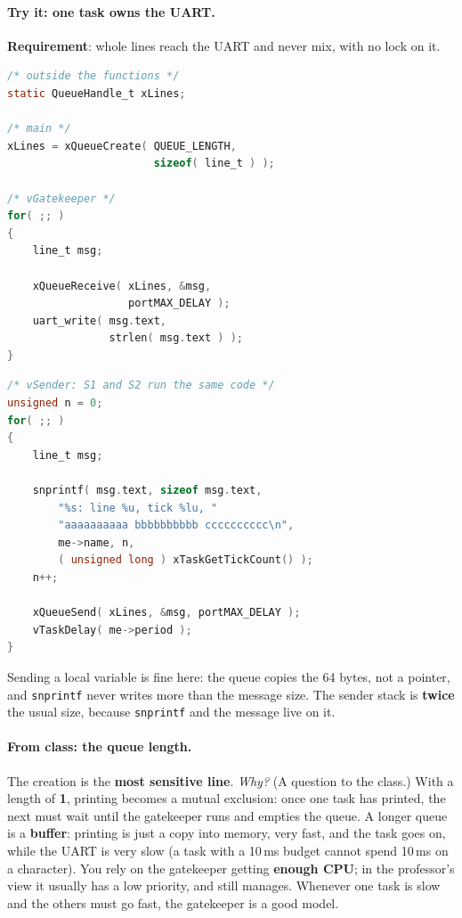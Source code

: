 \paragraph{Try it: one task owns the UART.} \textbf{Requirement}: whole lines reach the UART and never mix, with no lock on it.
\par\noindent\begin{minipage}[t]{0.44\textwidth}
\begin{lstlisting}[language=C, showstringspaces=false, basicstyle=\ttfamily\scriptsize]
/* outside the functions */
static QueueHandle_t xLines;

/* main */
xLines = xQueueCreate( QUEUE_LENGTH,
                       sizeof( line_t ) );

/* vGatekeeper */
for( ;; )
{
    line_t msg;

    xQueueReceive( xLines, &msg,
                   portMAX_DELAY );
    uart_write( msg.text,
                strlen( msg.text ) );
}
\end{lstlisting}
\end{minipage}\hfill
\begin{minipage}[t]{0.53\textwidth}
\begin{lstlisting}[language=C, showstringspaces=false, basicstyle=\ttfamily\scriptsize]
/* vSender: S1 and S2 run the same code */
unsigned n = 0;
for( ;; )
{
    line_t msg;

    snprintf( msg.text, sizeof msg.text,
        "%s: line %u, tick %lu, "
        "aaaaaaaaaa bbbbbbbbbb cccccccccc\n",
        me->name, n,
        ( unsigned long ) xTaskGetTickCount() );
    n++;

    xQueueSend( xLines, &msg, portMAX_DELAY );
    vTaskDelay( me->period );
}
\end{lstlisting}
\end{minipage}

\noindent Sending a local variable is fine here: the queue copies the 64 bytes, not a pointer, and \texttt{snprintf} never writes more than the message size. The sender stack is \textbf{twice} the usual size, because \texttt{snprintf} and the message live on it.

\paragraph{From class: the queue length.} The creation is the \textbf{most sensitive line}. \emph{Why?} (A question to the class.) With a length of \textbf{1}, printing becomes a mutual exclusion: once one task has printed, the next must wait until the gatekeeper runs and empties the queue. A longer queue is a \textbf{buffer}: printing is just a copy into memory, very fast, and the task goes on, while the UART is very slow (a task with a 10\,ms budget cannot spend 10\,ms on a character). You rely on the gatekeeper getting \textbf{enough CPU}; in the professor's view it usually has a low priority, and still manages. Whenever one task is slow and the others must go fast, the gatekeeper is a good model.

